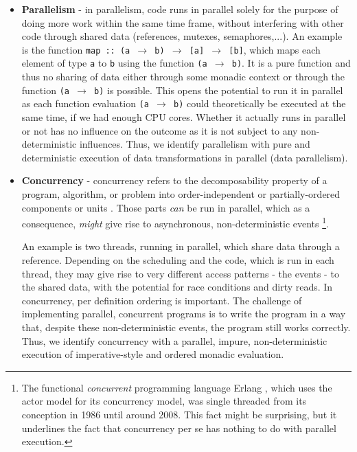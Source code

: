 \begin{itemize}
	\item \textbf{Parallelism} - in parallelism, code runs in parallel solely for the purpose of doing more work within the same time frame, without interfering with other code through shared data (references, mutexes, semaphores,...). An example is the function \texttt{map :: (a $\rightarrow$ b) $\rightarrow$ [a] $\rightarrow$ [b]}, which maps each element of type \texttt{a} to \texttt{b} using the function \texttt{(a $\rightarrow$ b)}. It is a pure function and thus no sharing of data either through some monadic context or through the function \texttt{(a $\rightarrow$ b)} is possible. This opens the potential to run it in parallel as each function evaluation \texttt{(a $\rightarrow$ b)} could theoretically be executed at the same time, if we had enough CPU cores. Whether it actually runs in parallel or not has no influence on the outcome as it is not subject to any non-deterministic influences. Thus, we identify parallelism with pure and deterministic execution of data transformations in parallel (data parallelism).

	\item \textbf{Concurrency} - concurrency refers to the decomposability property of a program, algorithm, or problem into order-independent or partially-ordered components or units \cite{lamport_time_1978}. Those parts \textit{can} be run in parallel, which as a consequence, \textit{might} give rise to asynchronous, non-deterministic events \footnote{The functional \textit{concurrent} programming language Erlang \cite{armstrong_erlang_2010}, which uses the actor model for its concurrency model, was single threaded from its conception in 1986 until around 2008. This fact might be surprising, but it underlines the fact that concurrency per se has nothing to do with parallel execution.}.

	An example is two threads, running in parallel, which share data through a reference. Depending on the scheduling and the code, which is run in each thread, they may give rise to very different access patterns - the events - to the shared data, with the potential for race conditions and dirty reads. In concurrency, per definition ordering is important. The challenge of implementing parallel, concurrent programs is to write the program in a way that, despite these non-deterministic events, the program still works correctly. Thus, we identify concurrency with a parallel, impure, non-deterministic execution of imperative-style and ordered monadic evaluation.
\end{itemize}


